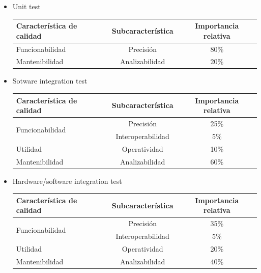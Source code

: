 \documentclass[
11pt, %
]{charter}
\begin{document}
\begin{itemize}
	\item Unit test	
	
		\begin{table}[H]
		\centering
		\begin{tabular}{|l|c|c|}
		\hline
		\rowcolor[HTML]{C0C0C0}
		Característica de calidad	& Subcaracterística		& Importancia relativa\\ \hline
		 Funcionabilidad 			& Precisión 		& 80\%	\\ \hline
		Mantenibilidad				& Analizabilidad					& 20\%						\\ \hline
		\end{tabular}
		\label{tab:caracteristicasDeCalidad}
		\end{table}

	\item Sotware integration test
	
	
		\begin{table}[H]
		\centering
		\begin{tabular}{|l|c|c|}
		\hline
		\rowcolor[HTML]{C0C0C0}
		Característica de calidad	& Subcaracterística		& Importancia relativa\\ \hline
		\multirow{2}{*}{Funcionabilidad} 			& Precisión 		& 25\%	\\\cline{2-3}
		  										& Interoperabilidad 	& 5\%							\\ \hline
		Utilidad					& Operatividad						& 10\%						\\ \hline
		Mantenibilidad				& Analizabilidad					& 60\%						\\ \hline
		\end{tabular}
		\label{tab:caracteristicasDeCalidad}
		\end{table}

	\item Hardware/software integration test
	
		\begin{table}[H]
		\centering
		\begin{tabular}{|l|c|c|}
		\hline
		\rowcolor[HTML]{C0C0C0}
		Característica de calidad	& Subcaracterística		& Importancia relativa\\ \hline
		\multirow{2}{*}{Funcionabilidad} 			& Precisión 		& 35\%	\\\cline{2-3}
		  										& Interoperabilidad 	& 5\%							\\ \hline
		Utilidad					& Operatividad						& 20\%						\\ \hline
		Mantenibilidad				& Analizabilidad					& 40\%						\\ \hline
		\end{tabular}
		\label{tab:caracteristicasDeCalidad}
		\end{table}


\end{itemize}
\end{document}
